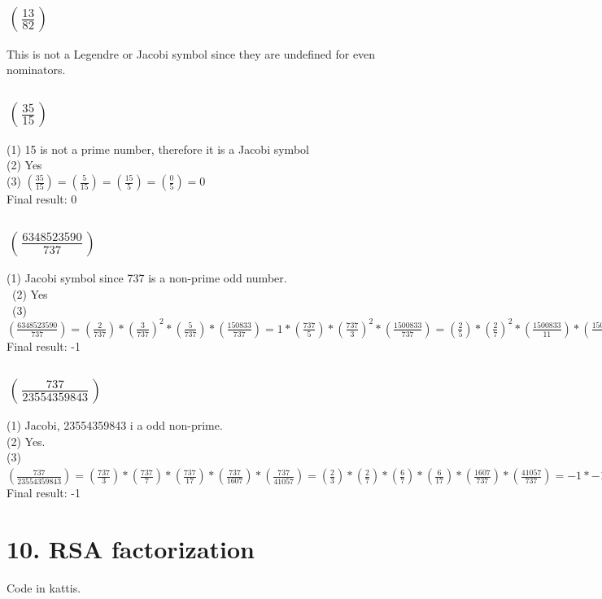 \documentclass[a4paper,11pt]{article}
\def\lag[#1]#2{\left(\frac{#1}{#2}\right) }
\begin{document}
	\subsection*{$\lag[13]{82}$}
		This is not a Legendre or Jacobi symbol since they are undefined for even nominators.
	\subsection*{$\lag[35]{15}$}
		(1) 15 is not a prime number, therefore it is a Jacobi symbol\\
		(2) Yes\\
		(3) $\lag[35]{15} = \lag[5]{15} = \lag[15]{5} = \lag[0]{5} = 0$\\
		Final result: 0
	\subsection*{$\lag[6348523590]{737}$}
		(1) Jacobi symbol since 737 is a non-prime odd number.\\\
		(2) Yes\\\
		(3) $\lag[6348523590]{737} = \lag[2]{737}*\lag[3]{737}^2*\lag[5]{737}*\lag[150833]{737} = 1 * \lag[737]{5} * \lag[737]{3}^2 * \lag[1500833]{737} = 
			\lag[2]{5}*\lag[2]{7}^2 * \lag[1500833]{11} * \lag[1500833]{67} = -1 * \lag[4]{11} * \lag[33]{67} = 
			-1 * \lag[11]{4} * \lag[67]{33} = -1 * \lag[3]{4}*\lag[1]{33} = -1 * 1 * \lag[1]{3} * \lag[1]{11} = -1 * 1 * 1 = -1$\\
			Final result: -1 
	\subsection*{$\lag[737]{23554359843}$}
		(1) Jacobi, 23554359843 i a odd non-prime.\\
		(2) Yes. \\
		(3) $\lag[737]{23554359843} = \lag[737]{3} * \lag[737]{7} * \lag[737]{17}*\lag[737]{1607}*\lag[737]{41057} = 
		\lag[2]{3} * \lag[2]{7} * \lag[6]{7} * \lag[6]{17} * \lag[1607]{737}*\lag[41057]{737} = 
		-1 * -1 * -1 * 1 * -1 * \lag[133]{737}*\lag[522]{737} =
		1 * \lag[7]{737} * \lag[19]{737} * \lag[2]{737} * \lag[3]{737}^2 * \lag[29]{737} = 
		1 * \lag[15]{19} * (-1)^2 * \lag[12]{29} = \lag[19]{15} * \lag[29]{12} = \lag[2]{15}^2 * \lag[15]{12} = 1 * 1 \lag[7]{12} = \lag[12]{7} = \lag[5]{7} = \lag[7]{5} = \lag[2]{5} = -1$\\
		Final result: -1\\

	\section*{10. RSA factorization}
		Code in kattis.
		 
		
\end{document}
